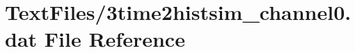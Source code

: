 \hypertarget{3time2histsim__channel0_8dat}{}\section{Text\+Files/3time2histsim\+\_\+channel0.dat File Reference}
\label{3time2histsim__channel0_8dat}
